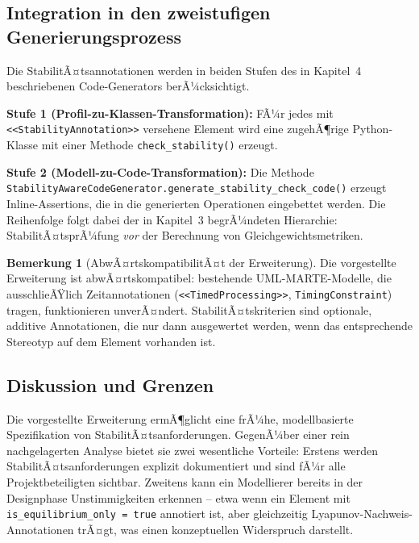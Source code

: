 ﻿\documentclass[a4paper,12pt]{report}
\theoremstyle{definition}
\newtheorem{bemerkung}{Bemerkung}[section]
\begin{document}
\subsection{Integration in den zweistufigen Generierungsprozess}

Die StabilitÃ¤tsannotationen werden in beiden Stufen des in Kapitel~4
beschriebenen Code-Generators berÃ¼cksichtigt.

\textbf{Stufe 1 (Profil-zu-Klassen-Transformation):} FÃ¼r jedes mit
\texttt{<<StabilityAnnota\newline tion>>} versehene Element wird eine zugehÃ¶rige
Python-Klasse mit einer Methode \texttt{check\_\newline stability()} erzeugt.

\textbf{Stufe 2 (Modell-zu-Code-Transformation):} Die Methode
\texttt{StabilityAwareCode\newline Generator\allowbreak.generate\_stability\_check\_code()}
erzeugt Inline-Assertions, die in die generierten Operationen eingebettet
werden. Die Reihenfolge folgt dabei der in Kapitel~3 begrÃ¼ndeten Hierarchie:
StabilitÃ¤tsprÃ¼fung \textit{vor} der Berechnung von Gleichgewichtsmetriken.

\begin{bemerkung}[AbwÃ¤rtskompatibilitÃ¤t der Erweiterung]
	Die vorgestellte Erweiterung ist abwÃ¤rtskompatibel: bestehende
	UML-MARTE-Modelle, die ausschlieÃŸlich Zeitannotationen
	(\texttt{<<TimedProcessing>>}, \texttt{TimingConstraint}) tragen,
	funktionieren unverÃ¤ndert. StabilitÃ¤tskriterien sind optionale, additive
	Annotationen, die nur dann ausgewertet werden, wenn das entsprechende
	Stereotyp auf dem Element vorhanden ist.
\end{bemerkung}

\subsection{Diskussion und Grenzen}

Die vorgestellte Erweiterung ermÃ¶glicht eine frÃ¼he, modellbasierte
Spezifikation von StabilitÃ¤tsanforderungen. GegenÃ¼ber einer rein
nachgelagerten Analyse bietet sie zwei wesentliche Vorteile: Erstens werden
StabilitÃ¤tsanforderungen explizit dokumentiert und sind fÃ¼r alle
Projektbeteiligten sichtbar. Zweitens kann ein Modellierer bereits in der
Designphase Unstimmigkeiten erkennen -- etwa wenn ein Element mit
\texttt{is\_equilibrium\_only = true} annotiert ist, aber gleichzeitig
Lyapunov-Nachweis-Annotationen trÃ¤gt, was einen konzeptuellen Widerspruch
darstellt.
\end{document}

